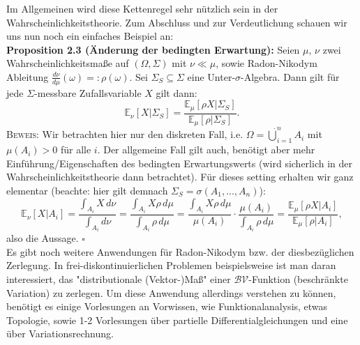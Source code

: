 \documentclass[11pt,english]{smfart}
\newcommand*{\QEDB}{\null\nobreak\hfill\ensuremath{\square}}
\begin{document}
\vspace{0.5cm}
Im Allgemeinen wird diese Kettenregel sehr nützlich sein in der Wahrscheinlichkeitstheorie. Zum Abschluss und zur Verdeutlichung schauen wir uns nun noch ein einfaches Beispiel an:\\[0.5cm]
\textbf{Proposition 2.3 (Änderung der bedingten Erwartung):} Seien \(\mu, \, \nu\) zwei Wahrscheinlichkeitsmaße auf \((\Omega,\Sigma)\) mit \(\nu \ll \mu\), sowie Radon-Nikodym Ableitung \(\frac{d\nu}{d\mu}(\omega) =: \rho(\omega)\). Sei \(\Sigma_S \subseteq \Sigma\) eine Unter-\(\sigma\)-Algebra. Dann gilt für jede \(\Sigma\)-messbare Zufallsvariable \(X\) gilt dann:
\begin{equation}
    \mathbb{E}_{\nu} [X | \Sigma_S] = \frac{\mathbb{E}_{\mu}[\rho X | \Sigma_S]}{\mathbb{E}_{\mu}[\rho | \Sigma_S]}.
\end{equation}
\textsc{Beweis:} Wir betrachten hier nur den diskreten Fall, i.e. \(\Omega = \dot{\bigcup}_{i=1}^n A_i\) mit \(\mu(A_i) > 0\) für alle \(i\). Der allgemeine Fall gilt auch, benötigt aber mehr Einführung/Eigenschaften des bedingten Erwartungswerts (wird sicherlich in der Wahrscheinlichkeitstheorie dann betrachtet). Für dieses setting erhalten wir ganz elementar (beachte: hier gilt demnach \(\Sigma_S = \sigma(A_1,...,A_n)\)):
\begin{equation}
    \mathbb{E}_{\nu}[X | A_i] = \frac{\int_{A_i} X \,d\nu}{\int_{A_i} d\nu} = \frac{\int_{A_i} X \rho \,d\mu}{\int_{A_i} \rho \,d\mu} = \frac{\int_{A_i} X \rho \,d\mu}{\mu(A_i)} \cdot \frac{\mu(A_i)}{\int_{A_i} \rho \,d\mu} = \frac{\mathbb{E}_{\mu}[\rho X | A_i]}{\mathbb{E}_{\mu} [\rho | A_i]},
\end{equation}
also die Aussage. \QEDB
\\[0.5cm]
Es gibt noch weitere Anwendungen für Radon-Nikodym bzw. der diesbezüglichen Zerlegung. In frei-diskontinuierlichen Problemen beispielsweise ist man daran interessiert, das "distributionale (Vektor-)Maß" einer \(\mathcal{BV}\)-Funktion (beschränkte Variation) zu zerlegen. Um diese Anwendung allerdings verstehen zu können, benötigt es einige Vorlesungen an Vorwissen, wie Funktionalanalysis, etwas Topologie, sowie 1-2 Vorlesungen über partielle Differentialgleichungen und eine über Variationsrechnung.
\end{document}
